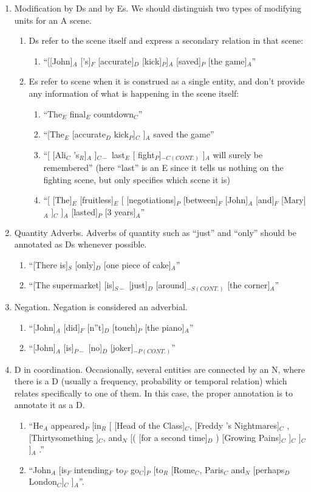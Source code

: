 \documentclass[11pt]{article}
\newcommand{\be}{\begin{enumerate}}
\newcommand{\ee}{\end{enumerate}}
\begin{document}
\be \item
Modification by Ds and by Es. We should distinguish two types of modifying units for an A scene.
\be
\item
Ds refer to the scene itself and express a secondary relation in that scene:
\be \item ``[[John]$_A$ ['s]$_F$ [accurate]$_D$ [kick]$_P$]$_A$ [saved]$_P$ [the game]$_A$'' \ee
\item
Es refer to scene when it is construed as a single entity, and don't provide any information of what is happening in the scene itself:
\be \item
``The$_E$ final$_E$ countdown$_C$''
\item
``[The$_E$ [accurate$_D$ kick$_P$]$_C$ ]$_A$ saved the game''
\item
``[ [Ali$_C$ 's$_R$]$_A$ ]$_{C-}$ last$_E$ [ fight$_P$]$_{-C(CONT.)}$ ]$_A$ will surely be remembered'' (here ``last'' is an E since it tells us nothing on the fighting scene, but only specifies which scene it is)
\item
``[ [The]$_E$ [fruitless]$_E$ [ [negotiations]$_P$ [between]$_F$ [John]$_A$ [and]$_F$ [Mary]$_A$ ]$_C$ ]$_A$ [lasted]$_P$ [3 years]$_A$''
\ee
\ee
\item
Quantity Adverbs. Adverbs of quantity such as ``just'' and ``only'' should be annotated as Ds whenever possible.
\be \item
``[There is]$_S$ [only]$_D$ [one piece of cake]$_A$''
\item
``[The supermarket] [is]$_{S-}$ [just]$_D$ [around]$_{-S(CONT.)}$ [the corner]$_A$''
\ee
\item
Negation. Negation is considered an adverbial.
\be \item
``[John]$_A$ [did]$_F$ [n''t]$_D$ [touch]$_P$ [the piano]$_A$''
\item
``[John]$_A$ [is]$_{P-}$ [no]$_D$ [joker]$_{-P(CONT.)}$''
\ee
\item D in coordination. Occasionally, several entities are connected by an N, where there is a D (usually a frequency, probability or temporal relation) which relates specifically to one of them. In this case, the proper annotation is to annotate it as a D.
\be
\item
``He$_A$ appeared$_P$ [in$_R$ [ [Head of the Class]$_C$, [Freddy 's Nightmares]$_C$ , [Thirtysomething ]$_C$, and$_N$ [( [for a second time]$_D$ ) [Growing Pains]$_C$ ]$_C$ ]$_C$ ]$_A$ .''
\item
``John$_A$ [is$_F$ intending$_F$ to$_F$ go$_C$]$_P$ [to$_R$ [Rome$_C$, Paris$_C$ and$_N$ [perhaps$_D$ London$_C$]$_C$ ]$_A$''.
\ee
\ee
\end{document}
